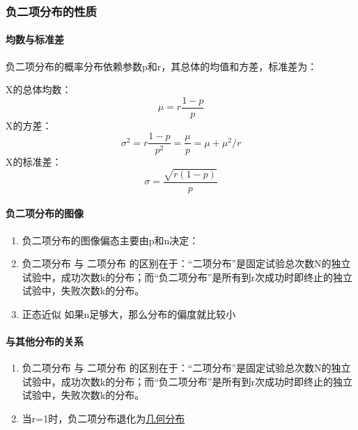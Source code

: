\documentclass[
]{article}
\providecommand{\tightlist}{%
  \setlength{\itemsep}{0pt}\setlength{\parskip}{0pt}}
\begin{document}
\hypertarget{ux8d1fux4e8cux9879ux5206ux5e03ux7684ux6027ux8d28}{%
\subsubsection{负二项分布的性质}\label{ux8d1fux4e8cux9879ux5206ux5e03ux7684ux6027ux8d28}}

\hypertarget{ux5747ux6570ux4e0eux6807ux51c6ux5dee-2}{%
\paragraph{均数与标准差}\label{ux5747ux6570ux4e0eux6807ux51c6ux5dee-2}}

负二项分布的概率分布依赖参数p和r，其总体的均值和方差，标准差为：

X的总体均数：
\[μ=r\frac{1-p}{p}\]
X的方差：
\[σ^2=r\frac{1-p}{p^2}=\frac{μ}{p}=μ+μ^2/r\]
X的标准差：
\[σ=\frac{\sqrt{r(1-p)}}{p}\]

\hypertarget{ux8d1fux4e8cux9879ux5206ux5e03ux7684ux56feux50cf}{%
\paragraph{负二项分布的图像}\label{ux8d1fux4e8cux9879ux5206ux5e03ux7684ux56feux50cf}}

\begin{enumerate}
\def\labelenumi{\arabic{enumi}.}
\tightlist
\item
  负二项分布的图像偏态主要由p和n决定：
\item
  负二项分布 与 二项分布 的区别在于：``二项分布''是固定试验总次数N的独立试验中，成功次数k的分布；而``负二项分布''是所有到r次成功时即终止的独立试验中，失败次数k的分布。
\item
  正态近似 如果n足够大，那么分布的偏度就比较小
\end{enumerate}

\hypertarget{ux4e0eux5176ux4ed6ux5206ux5e03ux7684ux5173ux7cfb-1}{%
\paragraph{与其他分布的关系}\label{ux4e0eux5176ux4ed6ux5206ux5e03ux7684ux5173ux7cfb-1}}

\begin{enumerate}
\def\labelenumi{\arabic{enumi}.}
\tightlist
\item
  负二项分布 与 二项分布 的区别在于：``二项分布''是固定试验总次数N的独立试验中，成功次数k的分布；而``负二项分布''是所有到r次成功时即终止的独立试验中，失败次数k的分布。
\item
  当r=1时，负二项分布退化为\href{https://zh.wikipedia.org/zh-cn/\%E5\%B9\%BE\%E4\%BD\%95\%E5\%88\%86\%E4\%BD\%88}{几何分布}
\end{enumerate}
\end{document}
